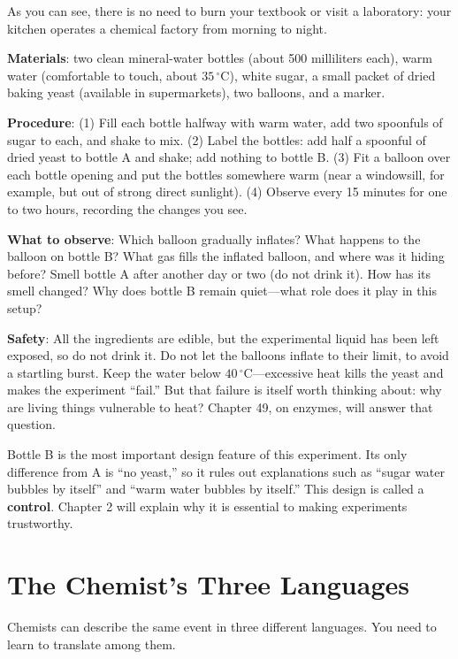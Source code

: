 As you can see, there is no need to burn your textbook or visit a laboratory: your kitchen operates a chemical factory from morning to night.

\begin{shiyan}
\textbf{Materials}: two clean mineral-water bottles (about 500 milliliters each), warm water (comfortable to touch, about $35\,^{\circ}\mathrm{C}$), white sugar, a small packet of dried baking yeast (available in supermarkets), two balloons, and a marker.

\textbf{Procedure}: (1) Fill each bottle halfway with warm water, add two spoonfuls of sugar to each, and shake to mix. (2) Label the bottles: add half a spoonful of dried yeast to bottle A and shake; add nothing to bottle B. (3) Fit a balloon over each bottle opening and put the bottles somewhere warm (near a windowsill, for example, but out of strong direct sunlight). (4) Observe every 15 minutes for one to two hours, recording the changes you see.

\textbf{What to observe}: Which balloon gradually inflates? What happens to the balloon on bottle B? What gas fills the inflated balloon, and where was it hiding before? Smell bottle A after another day or two (do not drink it). How has its smell changed? Why does bottle B remain quiet---what role does it play in this setup?

\textbf{Safety}: All the ingredients are edible, but the experimental liquid has been left exposed, so do not drink it. Do not let the balloons inflate to their limit, to avoid a startling burst. Keep the water below $40\,^{\circ}\mathrm{C}$---excessive heat kills the yeast and makes the experiment ``fail.'' But that failure is itself worth thinking about: why are living things vulnerable to heat? Chapter 49, on enzymes, will answer that question.

Bottle B is the most important design feature of this experiment. Its only difference from A is ``no yeast,'' so it rules out explanations such as ``sugar water bubbles by itself'' and ``warm water bubbles by itself.'' This design is called a \textbf{control}. Chapter 2 will explain why it is essential to making experiments trustworthy.
\end{shiyan}

\section{The Chemist's Three Languages}

Chemists can describe the same event in three different languages. You need to learn to translate among them.

